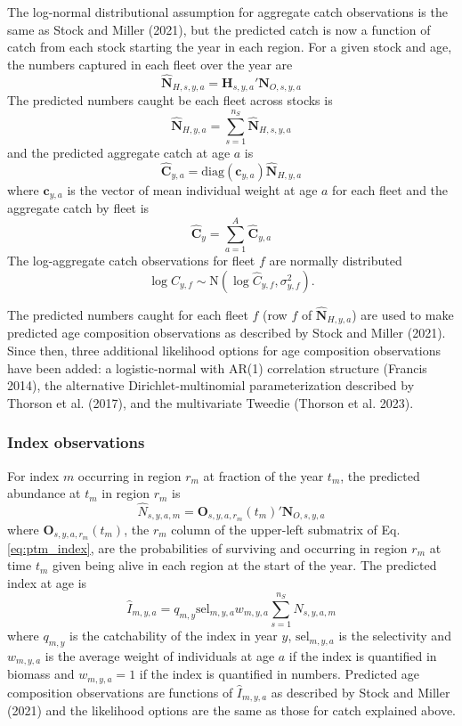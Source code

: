 \documentclass[
]{article}
\begin{document}
The log-normal distributional assumption for aggregate catch
observations is the same as Stock and Miller (2021), but the predicted
catch is now a function of catch from each stock starting the year in
each region. For a given stock and age, the numbers captured in each
fleet over the year are
\[\widehat{\mathbf{N}}_{H,s,y,a} = \mathbf{H}_{s,y,a}' \mathbf{N}_{O,s,y,a}\]
The predicted numbers caught be each fleet across stocks is
\[\widehat{\mathbf{N}}_{H,y,a} = \sum^{n_S}_{s=1} \widehat{\mathbf{N}}_{H,s,y,a}\]
and the predicted aggregate catch at age \(a\) is
\[\widehat{\mathbf{C}}_{y,a} = \text{diag}\left(\mathbf{c}_{y,a}\right) \widehat{\mathbf{N}}_{H,y,a}\]
where \(\mathbf{c}_{y,a}\) is the vector of mean individual weight at
age \(a\) for each fleet and the aggregate catch by fleet is
\[\widehat{\mathbf{C}}_y = \sum^{A}_{a=1} \widehat{\mathbf{C}}_{y,a}\]
The log-aggregate catch observations for fleet \(f\) are normally
distributed
\[ \log C_{y,f} \sim \text{N}\left(\log \widehat {C}_{y,f}, \sigma^2_{y,f}\right).\]

The predicted numbers caught for each fleet \(f\) (row \(f\) of
\(\widehat{\mathbf{N}}_{H,y,a}\)) are used to make predicted age
composition observations as described by Stock and Miller (2021). Since
then, three additional likelihood options for age composition
observations have been added: a logistic-normal with AR(1) correlation
structure (Francis 2014), the alternative Dirichlet-multinomial
parameterization described by Thorson et al. (2017), and the
multivariate Tweedie (Thorson et al. 2023).

\hypertarget{index-observations}{%
\subsubsection*{Index observations}\label{index-observations}}

For index \(m\) occurring in region \(r_m\) at fraction of the year
\(t_m\), the predicted abundance at \(t_m\) in region \(r_m\) is
\[\widehat{N}_{s,y,a,m} = \mathbf{O}_{s,y,a,r_m}(t_m)' \mathbf{N}_{O,s,y,a}\]
where \(\mathbf{O}_{s,y,a,r_m}(t_m)\), the \(r_m\) column of the
upper-left submatrix of Eq. \ref{eq:ptm_index}, are the probabilities of
surviving and occurring in region \(r_m\) at time \(t_m\) given being
alive in each region at the start of the year. The predicted index at
age is
\[\widehat{I}_{m,y,a} = q_{m,y} \text{sel}_{m,y,a}w_{m,y,a}\sum^{n_S}_{s = 1}\widehat{N}_{s,y,a,m}\]
where \(q_{m,y}\) is the catchability of the index in year \(y\),
\(\text{sel}_{m,y,a}\) is the selectivity and \(w_{m,y,a}\) is the
average weight of individuals at age \(a\) if the index is quantified in
biomass and \(w_{m,y,a} = 1\) if the index is quantified in numbers.
Predicted age composition observations are functions of
\(\widehat{I}_{m,y,a}\) as described by Stock and Miller (2021) and the
likelihood options are the same as those for catch explained above.
\end{document}

